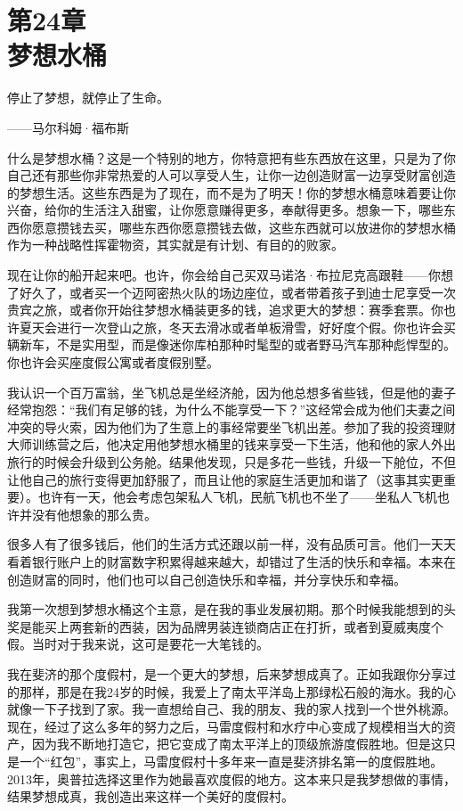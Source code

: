 
\section[第24章\q 梦想水桶]{第24章\\ 梦想水桶}

\begin{BookQuote}
停止了梦想，就停止了生命。

\hfill ——马尔科姆·福布斯
\end{BookQuote}

什么是梦想水桶？这是一个特别的地方，你特意把有些东西放在这里，只是为了你自己还有那些你非常热爱的人可以享受人生，让你一边创造财富一边享受财富创造的梦想生活。这些东西是为了现在，而不是为了明天！你的梦想水桶意味着要让你兴奋，给你的生活注入甜蜜，让你愿意赚得更多，奉献得更多。想象一下，哪些东西你愿意攒钱去买，哪些东西你愿意攒钱去做，这些东西就可以放进你的梦想水桶作为一种战略性挥霍物资，其实就是有计划、有目的的败家。

现在让你的船开起来吧。也许，你会给自己买双马诺洛·布拉尼克高跟鞋——你想了好久了，或者买一个迈阿密热火队的场边座位，或者带着孩子到迪士尼享受一次贵宾之旅，或者你开始往梦想水桶装更多的钱，追求更大的梦想：赛季套票。你也许夏天会进行一次登山之旅，冬天去滑冰或者单板滑雪，好好度个假。你也许会买辆新车，不是实用型，而是像迷你库柏那种时髦型的或者野马汽车那种彪悍型的。你也许会买座度假公寓或者度假别墅。

我认识一个百万富翁，坐飞机总是坐经济舱，因为他总想多省些钱，但是他的妻子经常抱怨：“我们有足够的钱，为什么不能享受一下？”这经常会成为他们夫妻之间冲突的导火索，因为他们为了生意上的事经常要坐飞机出差。参加了我的投资理财大师训练营之后，他决定用他梦想水桶里的钱来享受一下生活，他和他的家人外出旅行的时候会升级到公务舱。结果他发现，只是多花一些钱，升级一下舱位，不但让他自己的旅行变得更加舒服了，而且让他的家庭生活更加和谐了（这事其实更重要）。也许有一天，他会考虑包架私人飞机，民航飞机也不坐了——坐私人飞机也许并没有他想象的那么贵。

很多人有了很多钱后，他们的生活方式还跟以前一样，没有品质可言。他们一天天看着银行账户上的财富数字积累得越来越大，却错过了生活的快乐和幸福。本来在创造财富的同时，他们也可以自己创造快乐和幸福，并分享快乐和幸福。

我第一次想到梦想水桶这个主意，是在我的事业发展初期。那个时候我能想到的头奖是能买上两套新的西装，因为品牌男装连锁商店正在打折，或者到夏威夷度个假。当时对于我来说，这可是要花一大笔钱的。

我在斐济的那个度假村，是一个更大的梦想，后来梦想成真了。正如我跟你分享过的那样，那是在我24岁的时候，我爱上了南太平洋岛上那绿松石般的海水。我的心就像一下子找到了家。我一直想给自己、我的朋友、我的家人找到一个世外桃源。现在，经过了这么多年的努力之后，马雷度假村和水疗中心变成了规模相当大的资产，因为我不断地打造它，把它变成了南太平洋上的顶级旅游度假胜地。但是这只是一个“红包”，事实上，马雷度假村十多年来一直是斐济排名第一的度假胜地。2013年，奥普拉选择这里作为她最喜欢度假的地方。这本来只是我梦想做的事情，结果梦想成真，我创造出来这样一个美好的度假村。

